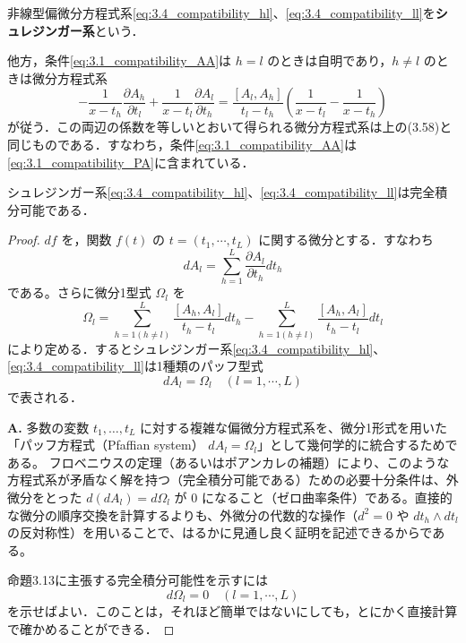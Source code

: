 \begin{definition}
非線型偏微分方程式系\eqref{eq:3.4_compatibility_hl}、\eqref{eq:3.4_compatibility_ll}を\textbf{シュレジンガー系}という．
\end{definition}

他方，条件\eqref{eq:3.1_compatibility_AA}は $h=l$ のときは自明であり，$h \neq l$ のときは微分方程式系
\[
  -\frac{1}{x-t_h} \frac{\partial A_h}{\partial t_l} + \frac{1}{x-t_l} \frac{\partial A_l}{\partial t_h} = \frac{[A_l, A_h]}{t_l - t_h} \left( \frac{1}{x-t_l} - \frac{1}{x-t_h} \right)
\]
が従う．この両辺の係数を等しいとおいて得られる微分方程式系は上の(3.58)と同じものである．すなわち，条件\eqref{eq:3.1_compatibility_AA}は\eqref{eq:3.1_compatibility_PA}に含まれている．

\begin{proposition}\label{prop:3.4_schleginger_compatibility}
シュレジンガー系\eqref{eq:3.4_compatibility_hl}、\eqref{eq:3.4_compatibility_ll}は完全積分可能である．
\end{proposition}

\begin{proof}
$df$ を，関数 $f(t)$ の $t=(t_1,\cdots,t_L)$ に関する微分とする．すなわち
\[
  dA_l = \sum_{h=1}^L \frac{\partial A_l}{\partial t_h} dt_h
\]
である。さらに微分1型式 $\Omega_l$ を
\[
  \Omega_l = \sum_{h=1(h \neq l)}^L \frac{[A_h, A_l]}{t_h - t_l} dt_h - \sum_{h=1(h \neq l)}^L \frac{[A_h, A_l]}{t_h - t_l} dt_l
\]
により定める．するとシュレジンガー系\eqref{eq:3.4_compatibility_hl}、\eqref{eq:3.4_compatibility_ll}は1種類のパッフ型式
\[
  dA_l = \Omega_l \quad (l=1,\cdots,L)
\]
で表される．

\begin{Q}[シュレジンガー系の完全積分可能性を示すために、なぜ微分形式 $\Omega_l$ を導入し $d\Omega_l = 0$ を確かめるというアプローチをとるのか？]%
\textbf{A.} 多数の変数 $t_1, \dots, t_L$ に対する複雑な偏微分方程式系を、微分1形式を用いた「パッフ方程式（Pfaffian system） $dA_l = \Omega_l$」として幾何学的に統合するためである。
フロベニウスの定理（あるいはポアンカレの補題）により、このような方程式系が矛盾なく解を持つ（完全積分可能である）ための必要十分条件は、外微分をとった $d(dA_l) = d\Omega_l$ が $0$ になること（ゼロ曲率条件）である。直接的な微分の順序交換を計算するよりも、外微分の代数的な操作（$d^2 = 0$ や $dt_h \wedge dt_l$ の反対称性）を用いることで、はるかに見通し良く証明を記述できるからである。
\end{Q}

命題3.13に主張する完全積分可能性を示すには
\[
  d\Omega_l = 0 \quad (l=1,\cdots,L)
\]
を示せばよい．このことは，それほど簡単ではないにしても，とにかく直接計算で確かめることができる．
\end{proof}

